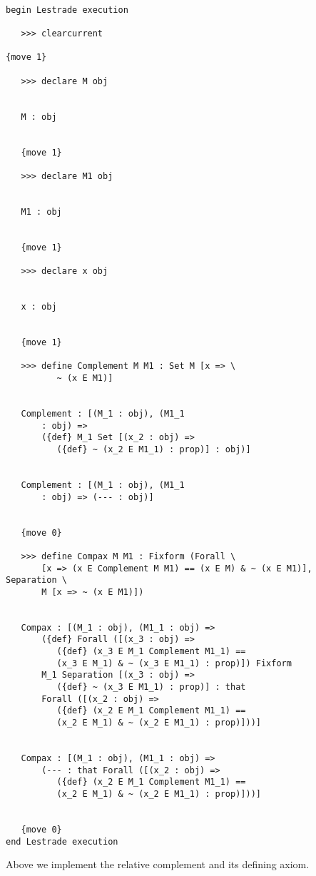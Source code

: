 \documentclass[12pt]{article}
\begin{document}
\begin{verbatim}

begin Lestrade execution

   >>> clearcurrent

{move 1}

   >>> declare M obj


   M : obj


   {move 1}

   >>> declare M1 obj


   M1 : obj


   {move 1}

   >>> declare x obj


   x : obj


   {move 1}

   >>> define Complement M M1 : Set M [x => \
          ~ (x E M1)]


   Complement : [(M_1 : obj), (M1_1 
       : obj) => 
       ({def} M_1 Set [(x_2 : obj) => 
          ({def} ~ (x_2 E M1_1) : prop)] : obj)]


   Complement : [(M_1 : obj), (M1_1 
       : obj) => (--- : obj)]


   {move 0}

   >>> define Compax M M1 : Fixform (Forall \
       [x => (x E Complement M M1) == (x E M) & ~ (x E M1)], Separation \
       M [x => ~ (x E M1)])


   Compax : [(M_1 : obj), (M1_1 : obj) => 
       ({def} Forall ([(x_3 : obj) => 
          ({def} (x_3 E M_1 Complement M1_1) == 
          (x_3 E M_1) & ~ (x_3 E M1_1) : prop)]) Fixform 
       M_1 Separation [(x_3 : obj) => 
          ({def} ~ (x_3 E M1_1) : prop)] : that 
       Forall ([(x_2 : obj) => 
          ({def} (x_2 E M_1 Complement M1_1) == 
          (x_2 E M_1) & ~ (x_2 E M1_1) : prop)]))]


   Compax : [(M_1 : obj), (M1_1 : obj) => 
       (--- : that Forall ([(x_2 : obj) => 
          ({def} (x_2 E M_1 Complement M1_1) == 
          (x_2 E M_1) & ~ (x_2 E M1_1) : prop)]))]


   {move 0}
end Lestrade execution
\end{verbatim}

Above we implement the relative complement and its defining axiom.
\end{document}
